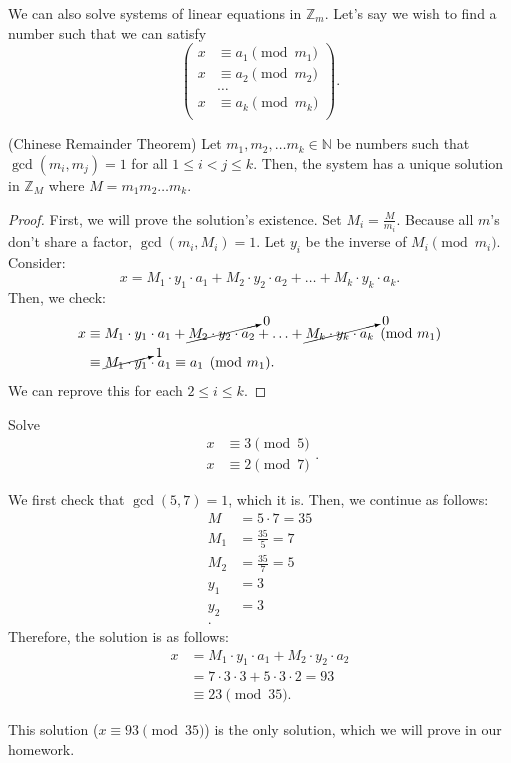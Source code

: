 We can also solve systems of linear equations in \( \mathbb{Z}_m \). Let's say we wish to find a number such that we can satisfy \[
	\begin{pmatrix}
		x &\equiv a_1 \pmod {m_1} \\
		x &\equiv a_2 \pmod {m_2} \\
			& \hdots \\
		x &\equiv a_k \pmod {m_k} \\
	\end{pmatrix}
.\] 

\begin{theorem}
	(Chinese Remainder Theorem) Let \( m_{1},m_{2},\ldots m_k \in \mathbb{N}\) be numbers such that \( \gcd(m_i,m_j)=1 \) for all \( 1 \le  i < j \le  k \). Then, the system has a unique solution in \( \mathbb{Z}_M \) where \( M=m_{1}m_{2}\ldots m_k \).
\end{theorem}

\begin{proof}
	First, we will prove the solution's existence. Set \( M_i =\frac{M}{m_i}\). Because all \( m \)'s don't share a factor, \( \gcd(m_i, M_i) = 1\). Let \( y_i \) be the inverse of \( M_i \pmod {m_i}\). Consider: \[
		x = M_1 \cdot y_{1} \cdot  a_{1} + M_{2} \cdot y_{2}\cdot a_{2}+ \ldots + M_{k} \cdot y_{k} \cdot a_{k}
	.\] Then, we check: 
	\begin{align*}
		x &\equiv M_{1}\cdot y_{1}\cdot a_{1}+ \cancelto{0}{M_{2}\cdot y_{2}\cdot a_{2}} + \ldots  + \cancelto{0}{M_k \cdot  y_k \cdot a_k} \pmod {m_1} \\
			& \equiv \cancelto{1}{M_{1}\cdot y_{1}}\cdot a_{1} \equiv a_{1} \pmod {m_1}
.\end{align*}
  We can reprove this for each \( 2\le i\le k \).
\end{proof}

\begin{eg}
	Solve \[
		\begin{matrix}
			x & \equiv 3 \pmod 5 \\
			x & \equiv 2 \pmod 7
		\end{matrix}
	.\] 
\end{eg}

We first check that \( \gcd(5,7)=1 \), which it is.
Then, we continue as follows:
\begin{align*}
	M&=5\cdot 7=35 \\
	M_1 &= \frac{35}{5} = 7 \\
	M_2 &= \frac{35}{7} = 5 \\
	y_{1} &= 3 \tag{Inverse of 7 mod 5} \\
	y_{2} &= 3 \tag{Inverse of 5 mod 7} \\
.\end{align*}
Therefore, the solution is as follows: 
\begin{align*} 
	x &= M_{1} \cdot  y_{1} \cdot  a_{1} + M_{2} \cdot  y_{2} \cdot  a_{2} \\
		&= 7 \cdot  3 \cdot 3 + 5 \cdot 3 \cdot  2 = 93\\
		& \equiv 23 \pmod {35}
.\end{align*}

\begin{note}
	This solution (\( x \equiv 93 \pmod {35} \)) is the only solution, which we will prove in our homework.
\end{note}
